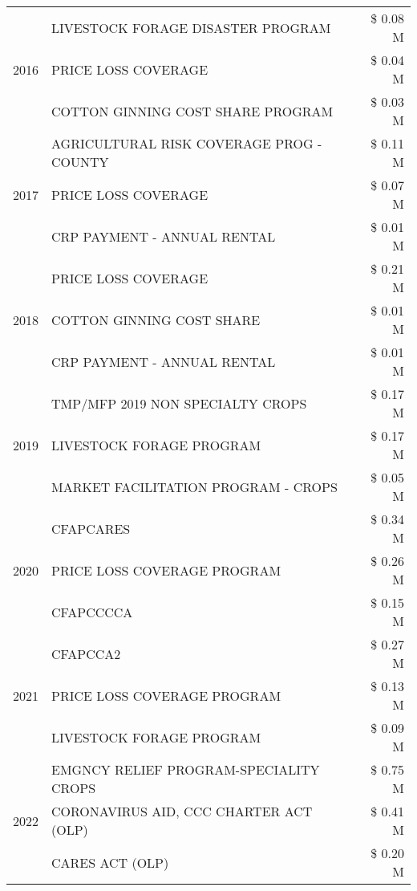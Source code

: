 \begin{tabular}{llr}
\cline{1-3}
\multirow[t]{3}{*}{2016} & LIVESTOCK FORAGE DISASTER PROGRAM & \$ 0.08 M \\
 & PRICE LOSS COVERAGE & \$ 0.04 M \\
 & COTTON GINNING COST SHARE PROGRAM & \$ 0.03 M \\
\cline{1-3}
\multirow[t]{3}{*}{2017} & AGRICULTURAL RISK COVERAGE PROG - COUNTY & \$ 0.11 M \\
 & PRICE LOSS COVERAGE & \$ 0.07 M \\
 & CRP PAYMENT - ANNUAL RENTAL & \$ 0.01 M \\
\cline{1-3}
\multirow[t]{3}{*}{2018} & PRICE LOSS COVERAGE & \$ 0.21 M \\
 & COTTON GINNING COST SHARE & \$ 0.01 M \\
 & CRP PAYMENT - ANNUAL RENTAL & \$ 0.01 M \\
\cline{1-3}
\multirow[t]{3}{*}{2019} & TMP/MFP 2019 NON SPECIALTY CROPS & \$ 0.17 M \\
 & LIVESTOCK FORAGE PROGRAM & \$ 0.17 M \\
 & MARKET FACILITATION PROGRAM - CROPS & \$ 0.05 M \\
\cline{1-3}
\multirow[t]{3}{*}{2020} & CFAPCARES & \$ 0.34 M \\
 & PRICE LOSS COVERAGE PROGRAM & \$ 0.26 M \\
 & CFAPCCCCA & \$ 0.15 M \\
\cline{1-3}
\multirow[t]{3}{*}{2021} & CFAPCCA2 & \$ 0.27 M \\
 & PRICE LOSS COVERAGE PROGRAM & \$ 0.13 M \\
 & LIVESTOCK FORAGE PROGRAM & \$ 0.09 M \\
\cline{1-3}
\multirow[t]{3}{*}{2022} & EMGNCY RELIEF PROGRAM-SPECIALITY CROPS & \$ 0.75 M \\
 & CORONAVIRUS AID, CCC CHARTER ACT (OLP) & \$ 0.41 M \\
 & CARES ACT (OLP) & \$ 0.20 M \\
\cline{1-3}
\bottomrule
\end{tabular}
